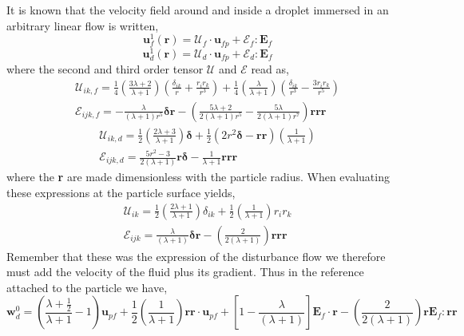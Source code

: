 It is known that the velocity field around and inside a droplet immersed in an arbitrary linear flow is written,
\begin{equation}
    \textbf{u}_f^1(\textbf{r})
    = 
    \mathcal{U}_f\cdot \textbf{u}_{fp}
    + \mathcal{E}_f: \textbf{E}_{f}
\end{equation}
\begin{equation}
    \textbf{u}_d^1(\textbf{r})
    = 
    \mathcal{U}_d\cdot \textbf{u}_{fp}
    + \mathcal{E}_d: \textbf{E}_{f}
\end{equation}
where the second and third order tensor $\mathcal{U}$ and $\mathcal{E}$ read as, 
\begin{align}
    \mathcal{U}_{ik,f} = 
    \frac{1}{4}\left(\frac{3\lambda + 2}{\lambda +1}\right)
    \left(\frac{\delta_{ik}}{r} + \frac{r_ir_k}{r^3}\right) 
    + 
    \frac{1}{4}\left(\frac{\lambda}{\lambda +1}\right)
    \left(\frac{\delta_{ik}}{r^3} - \frac{3r_ir_k}{r^5}\right)  \\
    \mathcal{E}_{ijk,f}
    =
    -\frac{\lambda}{(\lambda + 1)r^5} \bm\delta\textbf{r}
    -\left(\frac{5\lambda +2}{2(\lambda +1 )r^5} - \frac{5\lambda}{2(\lambda+1)r^7}\right) \textbf{rrr}
\end{align}
\begin{align}
    \mathcal{U}_{ik,d} = 
    \frac{1}{2}\left(\frac{2\lambda +3}{\lambda +1}\right)\bm\delta
    +\frac{1}{2} (2r^2 \bm\delta - \textbf{rr})
    \left(\frac{1}{\lambda +1}\right)\\
    \mathcal{E}_{ijk,d}
    =
    \frac{5r^2 -3}{2(\lambda +1)} \textbf{r}\bm\delta
    - \frac{1}{\lambda+1}\textbf{rrr}
\end{align}
where the \textbf{r} are made dimensionless with the particle radius. 
When evaluating these expressions at the particle surface yields, 
\begin{align}
    \mathcal{U}_{ik} = 
    \frac{1}{2}\left(\frac{2\lambda + 1}{\lambda +1}\right)
    \delta_{ik} 
    + 
    \frac{1}{2}\left(\frac{1}{\lambda +1}\right)
    r_ir_k  \\
    \mathcal{E}_{ijk}
    = 
    \frac{\lambda}{(\lambda + 1)}
    \bm\delta\textbf{r}
    -\left(\frac{2}{2(\lambda +1 )} \right) \textbf{rrr}
\end{align}
Remember that these was the expression of the disturbance flow we therefore must add the velocity of the fluid plus its gradient. 
Thus in the reference attached to the particle we have, 
\begin{equation*}
    \textbf{w}_d^0 
    = \left(\frac{\lambda + \frac{1}{2}}{\lambda +1} - 1\right)
    \textbf{u}_{pf} 
    + 
    \frac{1}{2}\left(\frac{1}{\lambda +1}\right)
    \textbf{rr} \cdot \textbf{u}_{pf} 
    + \left[1-\frac{\lambda}{(\lambda + 1)}\right]\textbf{E}_f\cdot\textbf{r}
    -\left(\frac{2}{2(\lambda +1 )} \right) \textbf{r} \textbf{E}_f:\textbf{rr}
\end{equation*}


